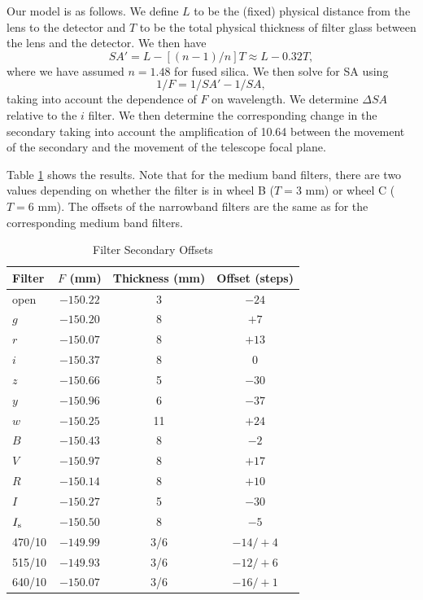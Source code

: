 Our model is as follows. We define $L$ to be the (fixed) physical distance from the lens to the detector and $T$ to be the total physical thickness of filter glass between the lens and the detector. We then have
$$
SA' = L - [(n - 1) / n] T \approx L - 0.32 T,
$$
where we have assumed $n = 1.48$ for fused silica. We then solve for SA using
$$
1/F = 1/SA' - 1/SA,
$$
taking into account the dependence of $F$ on wavelength. We determine $\Delta SA$ relative to the $i$ filter. We then determine the corresponding change in the secondary taking into account the amplification of 10.64 between the movement of the secondary and the movement of the telescope focal plane.

Table \ref{table:huitzi-f20-filter-secondary-offsets} shows the results. Note that for the medium band filters, there are two values depending on whether the filter is in wheel B ($T = 3$ mm) or wheel C ($T = 6$ mm). The offsets of the narrowband filters are the same as for the corresponding medium band filters.

\begin{table}
\begin{center}
\caption{Filter Secondary Offsets}
\label{table:huitzi-f20-filter-secondary-offsets}
\medskip
\begin{tabular}{lccc}
\hline
Filter&$F$ (mm)&Thickness (mm)&Offset (steps)\\
\hline
open		&$-150.22$		&\phantom{0}3		&\phantom{}$-24$\\
$g$		&$-150.20$		&\phantom{0}8		&\phantom{0}$+7$\\
$r$		&$-150.07$		&\phantom{0}8		&\phantom{}$+13$\\
$i$			&$-150.37$		&\phantom{0}8		&\phantom{+0}$0$\\
$z$		&$-150.66$		&\phantom{0}5		&\phantom{}$-30$\\
$y$		&$-150.96$		&\phantom{0}6		&\phantom{}$-37$\\
$w$		&$-150.25$		&\phantom{}11		&\phantom{}$+24$\\
$B$		&$-150.43$		&\phantom{0}8		&\phantom{0}$-2$\\
$V$		&$-150.97$		&\phantom{0}8		&\phantom{}$+17$\\
$R$		&$-150.14$		&\phantom{0}8		&\phantom{}$+10$\\
$I$		&$-150.27$		&\phantom{0}5		&\phantom{}$-30$\\
$\mbox{$I_\mathrm{s}$}$		&$-150.50$		&\phantom{0}8		&\phantom{0}$-5$\\
470/10	&$-149.99$		&\phantom{}3/6		&\phantom{}$-14/+4$\\
515/10	&$-149.93$		&\phantom{}3/6		&\phantom{}$-12/+6$\\
640/10	&$-150.07$		&\phantom{}3/6		&\phantom{}$-16/+1$\\
\hline
\end{tabular}
\end{center}
\end{table}

